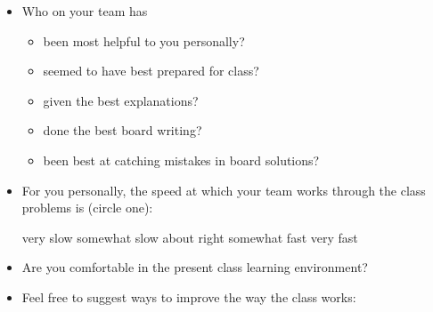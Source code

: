 \documentclass[handout]{mcs}
\begin{document}

\begin{itemize}

\item Who on your team has
  \begin{itemize}
    \item been most helpful to you personally?\hfill\brule{2in}
    \item seemed to have best prepared for class?\hfill\brule{2in}
    \item given the best explanations?\hfill\brule{2in}
    \item done the best board writing?\hfill\brule{2in}
    \item been best at catching mistakes in board solutions?\hfill\brule{2in}
  \end{itemize}

\item For you personally, the speed at which your team works through
  the class problems is (circle one):

very slow\hspace{0.4in} somewhat slow\hspace{0.4in} about
right\hspace{0.4in} somewhat fast\hspace{0.4in} very fast


\item Are you comfortable in the present class learning environment?
\vspace{1in}

\item Feel free to suggest ways to improve the way the class works:
\vspace{1in}

\iffalse

\item How helpful to you is the class teamwork in mastering the class material?

very helpful\hspace{0.4in} somewhat helpful\hspace{0.4in} 
right\hspace{0.4in} somewhat fast\hspace{0.4in} very fast
\fi


\end{itemize}
\end{document}
